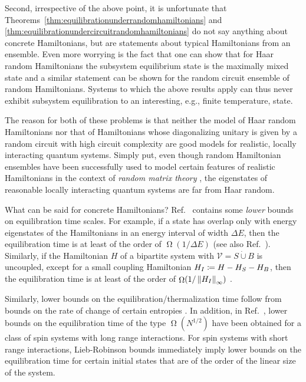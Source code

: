 \documentclass[a4paper,12pt,listof=totoc,index=totoc,bibliography=totoc,headsepline=false,headings=normal,BCOR16.153846mm,DIV12,headinclude,twoside,cleardoublepage=empty,numbers=noenddot,final]{scrreprt}
\theoremstyle{mystyle}
\numberwithin{equation}{section}
\numberwithin{figure}{section}
\numberwithin{lemma}{section}
\numberwithin{theorem}{section}
\numberwithin{corollary}{section}
\numberwithin{definition}{section}
\numberwithin{conjecture}{section}
\numberwithin{observation}{section}
\newcommand{\+}{\mkern2mu}
\newcommand{\coloneqq}{\mathrel{\vcentcolon\mkern-1.2mu=}} %
\newcommand{\dunion}{\mathbin{\dot{\cup}}}
\renewcommand{\H}{H}
\newcommand{\Vset}{\mathcal{V}}
\newcommand{\norm}[2][]{
  \ifthenelse{\equal{#1}{}}
    {\left\| {#2} \right\|}
    {\ifthenelse{\equal{#1}{uinv}}
      {\left\vert\kern-0.25ex\left\vert\kern-0.25ex\left\vert {#2} \right\vert\kern-0.25ex\right\vert\kern-0.25ex\right\vert}
      {\left\| {#2} \right\|_{#1}}
    }
}
\DeclareMathOperator{\landauOmega}{\Omega}
\DeclareMathOperator{\1}{\mathds{1}}
\begin{document}
Second, irrespective of the above point, it is unfortunate that Theorems~\ref{thm:equilibrationunderrandomhamiltonians} and \ref{thm:equilibrationundercircuitrandomhamiltonians} do not say anything about concrete Hamiltonians, but are statements about typical Hamiltonians from an ensemble.
Even more worrying is the fact that one can show that for Haar random Hamiltonians the subsystem equilibrium state is the maximally mixed state \cite[Corollary 1]{1112.5295v1} and a similar statement can be shown for the random circuit ensemble of random Hamiltonians.
Systems to which the above results apply can thus never exhibit subsystem equilibration to an interesting, e.g., finite temperature, state.

The reason for both of these problems is that neither the model of Haar random Hamiltonians nor that of Hamiltonians whose diagonalizing unitary is given by a random circuit with high circuit complexity are good models for realistic, locally interacting quantum systems.
Simply put, even though random Hamiltonian ensembles have been successfully used to model certain features of realistic Hamiltonians in the context of \emph{random matrix theory} \cite{1102.0528v1,0412017v2,Guhr1998,1006.1634v1,Gemmer09,Tabor1989,Bohigas1984,Tao2012,mehta90}, the eigenstates of reasonable locally interacting quantum systems are far from Haar random.

What can be said for concrete Hamiltonians?
Ref.~\cite{Gogolin10-masterthesis} contains some \emph{lower} bounds on equilibration time scales.
For example, if a state has overlap only with energy eigenstates of the Hamiltonians in an energy interval of width $\Delta E$, then the equilibration time is at least of the order of $\landauOmega(1/\Delta E)$ (see also Ref.~\cite{PhysRevE.50.88}).
Similarly, if the Hamiltonian $\H$ of a bipartite system with $\Vset = S \dunion B$ is uncoupled, except for a small coupling Hamiltonian $H_I \coloneqq \H - \H_S - \H_B$, then the equilibration time is at least of the order of $\landauOmega(1/\norm[\infty]{\H_I})$ \cite[Section 2.6.3]{Gogolin10-masterthesis}.

Similarly, lower bounds on the equilibration/thermalization time follow from bounds on the rate of change of certain entropies \cite{MasterThesisHutter,Hutter11}.
In addition, in Ref.~\cite{Kastner11}, lower bounds on the equilibration time of the type $\landauOmega(N^{1/2})$ have been obtained for a class of spin systems with long range interactions.
For spin systems with short range interactions, Lieb-Robinson bounds immediately imply lower bounds on the equilibration time for certain initial states that are of the order of the linear size of the system.
\end{document}
